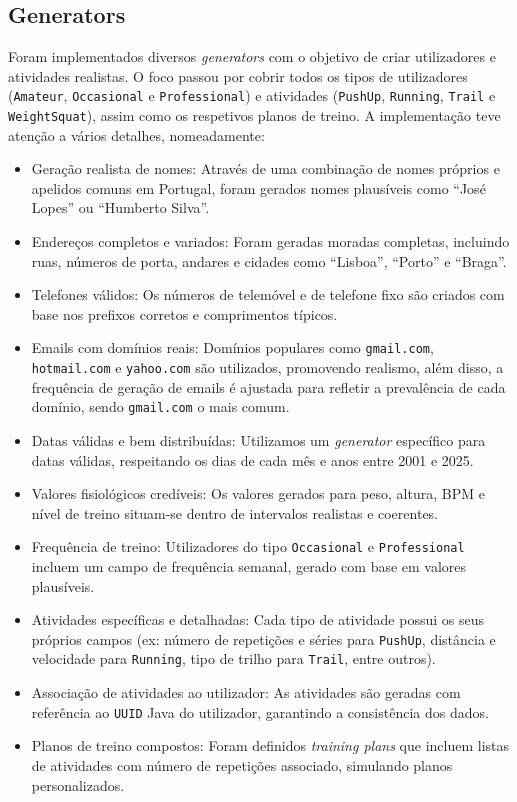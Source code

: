 \documentclass[12pt, a4paper]{article}
\begin{document}
\subsection{Generators}

Foram implementados diversos \emph{generators} com o objetivo de criar utilizadores e atividades
realistas. O foco passou por cobrir todos os tipos de utilizadores (\texttt{Amateur},
\texttt{Occasional} e \texttt{Professional}) e atividades (\texttt{PushUp}, \texttt{Running},
\texttt{Trail} e \texttt{WeightSquat}), assim como os respetivos planos de treino. A implementação
teve atenção a vários detalhes, nomeadamente:

\begin{itemize}
  \item Geração realista de nomes: Através de uma combinação de nomes próprios e apelidos comuns em
  Portugal, foram gerados nomes plausíveis como ``José Lopes'' ou ``Humberto Silva''.
  \item Endereços completos e variados: Foram geradas moradas completas, incluindo ruas, números de
  porta, andares e cidades como ``Lisboa'', ``Porto'' e ``Braga''.
  \item Telefones válidos: Os números de telemóvel e de telefone fixo são criados com base nos
  prefixos corretos e comprimentos típicos.
  \item Emails com domínios reais: Domínios populares como \texttt{gmail.com}, \texttt{hotmail.com}
  e \texttt{yahoo.com} são utilizados, promovendo realismo, além disso, a frequência de geração de
  emails é ajustada para refletir a prevalência de cada domínio, sendo \texttt{gmail.com} o mais
  comum.
  \item Datas válidas e bem distribuídas: Utilizamos um \emph{generator} específico para datas
  válidas, respeitando os dias de cada mês e anos entre 2001 e 2025.
  \item Valores fisiológicos credíveis: Os valores gerados para peso, altura, BPM e nível de treino
  situam-se dentro de intervalos realistas e coerentes.
  \item Frequência de treino: Utilizadores do tipo \texttt{Occasional} e \texttt{Professional}
  incluem um campo de frequência semanal, gerado com base em valores plausíveis.
  \item Atividades específicas e detalhadas: Cada tipo de atividade possui os seus próprios campos
  (ex: número de repetições e séries para \texttt{PushUp}, distância e velocidade para
  \texttt{Running}, tipo de trilho para \texttt{Trail}, entre outros).
  \item Associação de atividades ao utilizador: As atividades são geradas com referência ao
  \texttt{UUID} Java do utilizador, garantindo a consistência dos dados.
  \item Planos de treino compostos: Foram definidos \emph{training plans} que incluem listas de
  atividades com número de repetições associado, simulando planos personalizados.
\end{itemize}
\end{document}
